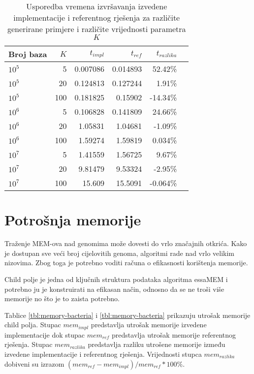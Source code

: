 \documentclass[times, utf8, seminar, numeric]{fer}
\begin{document}
\begin{table}[h]
	\centering
	\caption{Usporedba vremena izvršavanja izvedene implementacije i referentnog rješenja za različite generirane primjere i različite vrijednosti parametra $K$}
	\label{tbl:time-generated}
	
	\begin{tabular}{lrrrrr}
		\hline
        Broj baza & $K$ & $t_{impl}$ & $t_{ref}$ & $t_{razlika}$ \\ \hline
        $10^5$ & 5 & 0.007086 & 0.014893 & 52.42\% \\
        $10^5$ & 20 & 0.124813 & 0.127244 & 1.91\% \\
        $10^5$ & 100 & 0.181825 & 0.15902 & -14.34\% \\ \hline
        $10^6$ & 5 & 0.106828 & 0.141809 & 24.66\% \\
        $10^6$ & 20 & 1.05831 & 1.04681 & -1.09\% \\
        $10^6$ & 100 & 1.59274 & 1.59819 & 0.034\% \\ \hline
        $10^7$ & 5 & 1.41559 & 1.56725 & 9.67\% \\
        $10^7$ & 20 & 9.81479 & 9.53324 & -2.95\% \\
        $10^7$ & 100 & 15.609 & 15.5091 & -0.064\% \\
    \hline
	\end{tabular}
\end{table}

\section{Potrošnja memorije}
Traženje MEM-ova nad genomima može dovesti do vrlo značajnih otkrića. Kako je dostupan sve veći broj cijelovitih genoma, algoritmi rade nad vrlo velikim nizovima. Zbog toga je potrebno voditi računa o efikasnosti korištenja memorije. 

Child polje je jedna od ključnih struktura podataka algoritma essaMEM i potrebno ju je konstruirati na efikasan način, odnosno da se ne troši više memorije no što je to zaista potrebno.

Tablice \ref{tbl:memory-bacteria} i \ref{tbl:memory-bacteria} prikazuju utrošak memorije child polja. Stupac $mem_{impl}$  predstavlja utrošak memorije izvedene implementacije dok stupac $mem_{ref}$ predstavlja utrošak memorije referentnog rješenja. Stupac $mem_{razlika}$ predstavlja razliku utrošene memorije između izvedene implementacije i referentnog rješenja. Vrijednosti stupca $mem_{razlika}$ dobiveni su izrazom $(mem_{ref} - mem_{impl}) / mem_{ref} * 100\%$.
\end{document}
